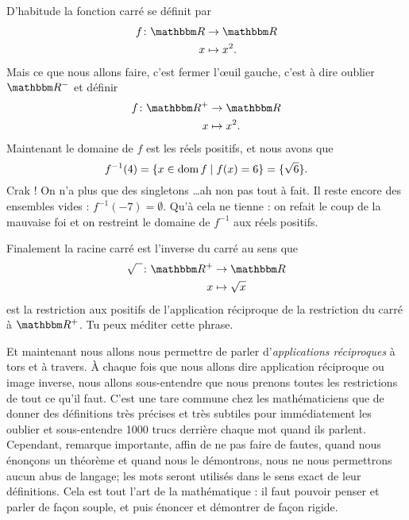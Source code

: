 D'habitude la fonction carré se définit par
\begin{equation}
\begin{aligned}
 f\colon \eR&\to \eR \\ 
   x&\mapsto x^2. 
\end{aligned}
\end{equation}
Mais ce que nous allons faire, c'est fermer l'\oe uil gauche, c'est à dire oublier $\eR^-$ et définir
\begin{equation}
\begin{aligned}
 f\colon \eR^+&\to \eR \\ 
   x&\mapsto x^2. 
\end{aligned}
\end{equation}
Maintenant le domaine de $f$ est les réels positifs, et nous avons que 
\[ 
  f^{-1}(4)=\{ x\in\operatorname{dom} f\mid f(x)=6 \}=\{ \sqrt{6} \}.
\]
Crak ! On n'a plus que des singletons \ldots ah non pas tout à fait. Il reste encore des ensembles vides : $f^{-1}(-7)=\emptyset$. Qu'à cela ne tienne : on refait le coup de la mauvaise foi et on restreint le domaine de $f^{-1}$ aux réels positifs.
 
Finalement la racine carré est l'inverse du carré au sens que
\begin{equation}
\begin{aligned}
 \sqrt{\phantom{x}}\colon \eR^+&\to \eR \\ 
   x&\mapsto \sqrt{x} 
\end{aligned}
\end{equation}
est la restriction aux positifs de l'application réciproque de la restriction du carré à $\eR^+$. Tu peux méditer cette phrase.

Et maintenant nous allons nous permettre de parler d'\emph{applications réciproques} à tors et à travers. À chaque fois que nous allons dire \og application réciproque\fg{} ou \og image inverse\fg, nous allons sous-entendre que nous prenons toutes les restrictions de tout ce qu'il faut. C'est une tare commune chez les mathématiciens que de donner des définitions très précises et très subtiles pour immédiatement les oublier et sous-entendre 1000 trucs derrière chaque mot quand ils parlent. Cependant, remarque importante, affin de ne pas faire de fautes, quand nous énonçons un théorème et quand nous le démontrons, nous ne nous permettrons aucun abus de langage; les mots seront utilisés dans le sens exact de leur définitions. Cela est tout l'art de la mathématique : il faut pouvoir penser et parler de façon souple, et puis énoncer et démontrer de façon rigide.

